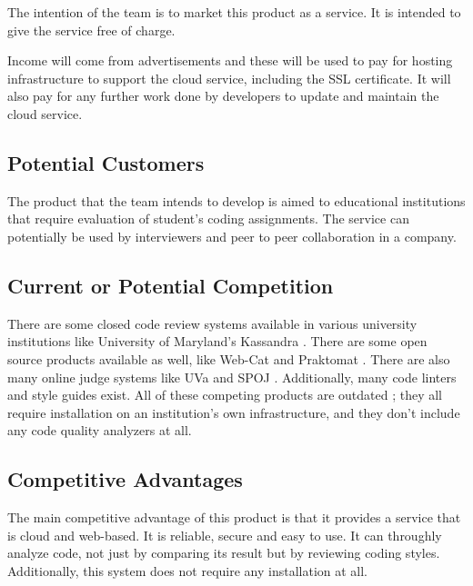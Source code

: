 
The intention of the team is to market this product as a service. It is intended
to give the service free of charge.

Income will come from advertisements and these will be used to pay for hosting
infrastructure to support the cloud service, including the SSL certificate. It
will also pay for any further work done by developers to update and maintain the
cloud service.

\subsection{Potential Customers}

The product that the team intends to develop is aimed to educational
institutions that require evaluation of student's coding assignments. The
service can potentially be used by interviewers and peer to peer collaboration
in a company.

\subsection{Current or Potential Competition}

There are some closed code review systems available in various university
institutions like University of Maryland's Kassandra \cite{Matt1994}. There are
some open source products available as well, like Web-Cat \cite{WebCat} and
Praktomat \cite{Praktomat}. There are also many online judge systems like UVa
\cite{UVA} and SPOJ \cite{SPOJ}. Additionally, many code linters and style
guides exist. All of these competing products are outdated
; they all require
installation on an institution's own infrastructure, and they don't include any
code quality analyzers at all.

\subsection{Competitive Advantages}

The main competitive advantage of this product is that it provides a service
that is cloud and web-based. It is reliable, secure and easy to use. It can
throughly analyze code, not just by comparing its result but by reviewing coding
styles. Additionally, this system does not require any installation at all.

